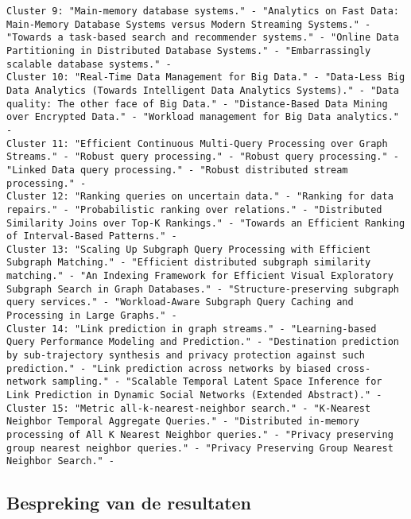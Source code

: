 \documentclass[11pt]{article}
\begin{document}
\begin{verbatim}
Cluster 9: "Main-memory database systems." - "Analytics on Fast Data: Main-Memory Database Systems versus Modern Streaming Systems." - "Towards a task-based search and recommender systems." - "Online Data Partitioning in Distributed Database Systems." - "Embarrassingly scalable database systems." - 
Cluster 10: "Real-Time Data Management for Big Data." - "Data-Less Big Data Analytics (Towards Intelligent Data Analytics Systems)." - "Data quality: The other face of Big Data." - "Distance-Based Data Mining over Encrypted Data." - "Workload management for Big Data analytics." - 
Cluster 11: "Efficient Continuous Multi-Query Processing over Graph Streams." - "Robust query processing." - "Robust query processing." - "Linked Data query processing." - "Robust distributed stream processing." - 
Cluster 12: "Ranking queries on uncertain data." - "Ranking for data repairs." - "Probabilistic ranking over relations." - "Distributed Similarity Joins over Top-K Rankings." - "Towards an Efficient Ranking of Interval-Based Patterns." - 
Cluster 13: "Scaling Up Subgraph Query Processing with Efficient Subgraph Matching." - "Efficient distributed subgraph similarity matching." - "An Indexing Framework for Efficient Visual Exploratory Subgraph Search in Graph Databases." - "Structure-preserving subgraph query services." - "Workload-Aware Subgraph Query Caching and Processing in Large Graphs." - 
Cluster 14: "Link prediction in graph streams." - "Learning-based Query Performance Modeling and Prediction." - "Destination prediction by sub-trajectory synthesis and privacy protection against such prediction." - "Link prediction across networks by biased cross-network sampling." - "Scalable Temporal Latent Space Inference for Link Prediction in Dynamic Social Networks (Extended Abstract)." - 
Cluster 15: "Metric all-k-nearest-neighbor search." - "K-Nearest Neighbor Temporal Aggregate Queries." - "Distributed in-memory processing of All K Nearest Neighbor queries." - "Privacy preserving group nearest neighbor queries." - "Privacy Preserving Group Nearest Neighbor Search." - 
\end{verbatim}

\subsection{Bespreking van de resultaten}
 
\end{document}

